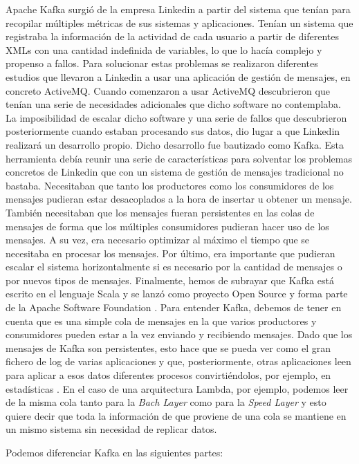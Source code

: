 Apache Kafka surgió de la empresa Linkedin a partir del sistema que tenían para recopilar múltiples métricas de sus sistemas y aplicaciones. Tenían un sistema que registraba la información de la actividad de cada usuario a partir de diferentes XMLs con una cantidad indefinida de variables, lo que lo hacía complejo y propenso a fallos. Para solucionar estas problemas se realizaron diferentes estudios que llevaron a Linkedin a usar una aplicación de gestión de mensajes, en concreto ActiveMQ. Cuando comenzaron a usar ActiveMQ descubrieron que tenían una serie de necesidades adicionales que dicho software no contemplaba. La imposibilidad de escalar dicho software y una serie de fallos que descubrieron posteriormente cuando estaban procesando sus datos, dio lugar a que Linkedin realizará un desarrollo propio. Dicho desarrollo fue bautizado como Kafka. Esta herramienta debía reunir una serie de características para solventar los problemas concretos de Linkedin que con un sistema de gestión de mensajes tradicional no bastaba. Necesitaban que tanto los productores como los consumidores de los mensajes pudieran estar desacoplados a la hora de insertar u obtener un mensaje. También necesitaban que los mensajes fueran persistentes en las colas de mensajes de forma que los múltiples consumidores pudieran hacer uso de los mensajes. A su vez, era necesario optimizar al máximo el tiempo que se necesitaba en procesar los mensajes. Por último, era importante que pudieran escalar el sistema horizontalmente si es necesario por la cantidad de mensajes o por nuevos tipos de mensajes. Finalmente, hemos de subrayar que Kafka está escrito en el lenguaje Scala y se lanzó como proyecto Open Source y forma parte de la Apache Software Foundation \cite{Kfk-1}. 
Para entender Kafka, debemos de tener en cuenta que es una simple cola de mensajes en la que varios productores y consumidores pueden estar a la vez enviando y recibiendo mensajes. Dado que los mensajes de Kafka son persistentes, esto hace que se pueda ver como el gran fichero de log de varias aplicaciones y que, posteriormente, otras aplicaciones leen para aplicar a esos datos diferentes procesos convirtiéndolos, por ejemplo, en estadísticas \cite{Kfk-6}. En el caso de una arquitectura Lambda, por ejemplo, podemos leer de la misma cola tanto para la \emph{Bach Layer} como para la \emph{Speed Layer} y esto quiere decir que toda la información de que proviene de una cola se mantiene en un mismo sistema sin necesidad de replicar datos.\par

Podemos diferenciar Kafka en las siguientes partes:\par

